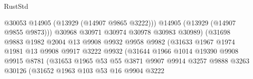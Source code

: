 \begin{lexlean}{RustStd}
\begin{coremodule}
                                          @30053
                                          @14905
                                          (@13929 (@14907 @9865 @3222)))
                                        @14905
                                        (@13929 (@14907 @9855 @9873)))
                                      @30968
                                      @30971
                                      @30974
                                      @30978
                                      @30983
                                      @30989)
                                    (@31698
                                      @9883
                                      @1982
                                      @2004
                                      @13
                                      @9908
                                      @9932
                                      @9958
                                      @9982
                                      (@31633
                                        @1967
                                        @1974
                                        @1981
                                        @13
                                        @9908
                                        @9917
                                        @3222
                                        @9932
                                        (@31644
                                          @1966
                                          @1014
                                          @19390
                                          @9908
                                          @9915
                                          @8781
                                          (@31653
                                            @1965
                                            @53
                                            @55
                                            @3871
                                            @9907
                                            @9914
                                            @3257
                                            @9888
                                            @3263
                                            @30126
                                            (@31652
                                              @1963
                                              @103
                                              @53
                                              @16
                                              @9904
                                              @3222

\end{coremodule}
\end{lexlean}
